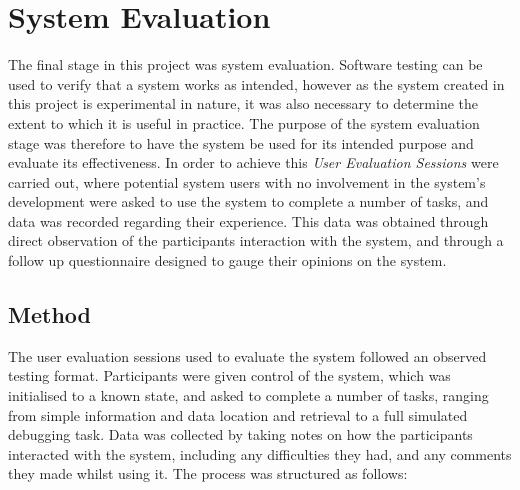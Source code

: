 
\chapter[System Evaluation]{System Evaluation} %

\label{ChapterEvaluation} %

The final stage in this project was system evaluation. Software testing can be used to verify that a system works as intended, however as the system created in this project is experimental in nature, it was also necessary to determine the extent to which it is useful in practice. The purpose of the system evaluation stage was therefore to have the system be used for its intended purpose and evaluate its effectiveness. In order to achieve this \textit{User Evaluation Sessions} were carried out, where potential system users with no involvement in the system's development were asked to use the system to complete a number of tasks, and data was recorded regarding their experience. This data was obtained through direct observation of the participants interaction with the system, and through a follow up questionnaire designed to gauge their opinions on the system.


\section{Method}

The user evaluation sessions used to evaluate the system followed an observed testing format. Participants were given control of the system, which was initialised to a known state, and asked to complete a number of tasks, ranging from simple information and data location and retrieval to a full simulated debugging task. Data was collected by taking notes on how the participants interacted with the system, including any difficulties they had, and any comments they made whilst using it. The process was structured as follows:

